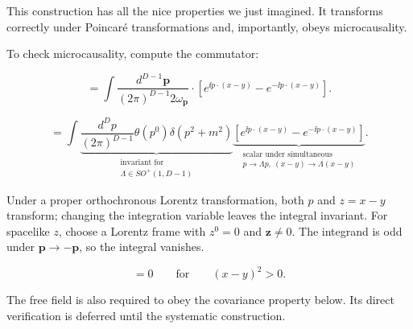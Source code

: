 This construction has all the nice properties we just imagined. It transforms
correctly under Poincaré transformations and, importantly, obeys microcausality.

To check microcausality, compute the commutator:

\begin{equation}
  [\hat\phi(x),\hat\phi(y)]
  =\int\frac{d^{D-1}\mathbf p}{(2\pi)^{D-1}2\omega_{\mathbf p}}
  \mathbin{\cdot}
  \left[e^{\ii p\cdot(x-y)}-e^{-\ii p\cdot(x-y)}\right].
  \label{eq:253a-free-field-commutator}
\end{equation}

\begin{equation}
  [\hat\phi(x),\hat\phi(y)]
  =\int
  \underbrace{\frac{d^D p}{(2\pi)^{D-1}}
    \theta(p^0)\delta(p^2+m^2)}_{
      \substack{\text{invariant for}\\
      \Lambda\in SO^+(1,D-1)}}
  \underbrace{\left[e^{\ii p\cdot(x-y)}-e^{-\ii p\cdot(x-y)}\right]}_{
      \substack{\text{scalar under simultaneous}\\
      p\to\Lambda p,\ (x-y)\to\Lambda(x-y)}}
  .
  \label{eq:253a-covariant-commutator}
\end{equation}

Under a proper orthochronous Lorentz transformation, both $p$ and
$z=x-y$ transform; changing the integration variable leaves the integral
invariant.  For spacelike $z$, choose a Lorentz frame with $z^0=0$ and
$\mathbf z\ne0$.  The integrand is odd under $\mathbf p\to-\mathbf p$, so the
integral vanishes.

\begin{equation}
  [\hat\phi(x),\hat\phi(y)]=0
  \qquad\text{for}\qquad (x-y)^2>0.
  \label{eq:253a-free-field-microcausality}
\end{equation}

The free field is also required to obey the covariance property below.  Its
direct verification is deferred until the systematic construction.

